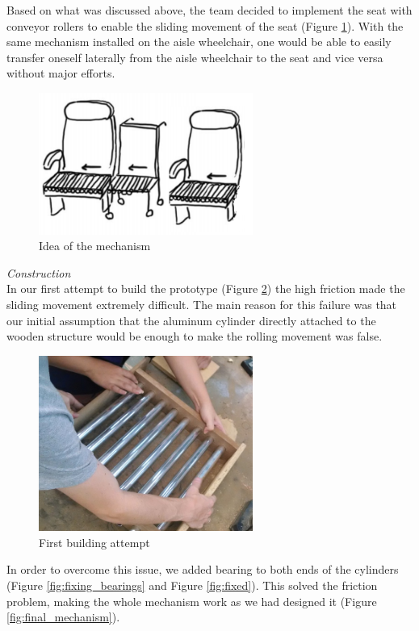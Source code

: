 Based on what was discussed above, the team decided to implement the seat with conveyor rollers to enable the sliding movement of the seat (Figure \ref{fig:idea_mechanism}). With the same mechanism installed on the aisle wheelchair, one would be able to easily transfer oneself laterally from the aisle wheelchair to the seat and vice versa without major efforts.

\begin{figure}[h]
\centering
\includegraphics[width=7cm]{brazil_images/image038.png}
\caption{Idea of the mechanism}
\label{fig:idea_mechanism}
\end{figure}


\noindent\emph{Construction}\\
In our first attempt to build the prototype (Figure \ref{fig:first_attempt}) the high friction made the sliding movement extremely difficult. The main reason for this failure was that our initial assumption that the aluminum cylinder directly attached to the wooden structure would be enough to make the rolling movement was false. \\

\begin{figure}[h]
\centering
\includegraphics[width=7cm]{brazil_images/image039.jpg}
\caption{First building attempt}
\label{fig:first_attempt}
\end{figure}


In order to overcome this issue, we added bearing to both ends of the cylinders (Figure \ref{fig:fixing_bearings} and Figure \ref{fig:fixed}). This solved the friction problem, making the whole mechanism work as we had designed it (Figure \ref{fig:final_mechanism}).	


